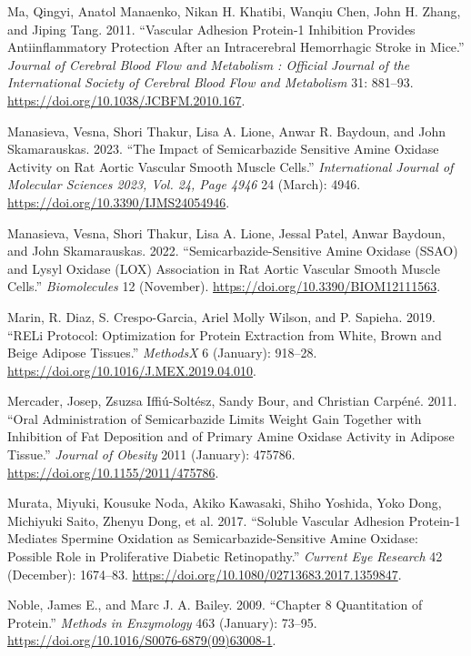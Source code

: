 \documentclass[
  letterpaper,
  DIV=11,
  numbers=noendperiod]{scrreprt}
\newlength{\cslhangindent}
\newenvironment{CSLReferences}[2] %
 {\begin{list}{}{%
  \setlength{\itemindent}{0pt}
  \setlength{\leftmargin}{0pt}
  \setlength{\parsep}{0pt}
  \ifodd #1
   \setlength{\leftmargin}{\cslhangindent}
   \setlength{\itemindent}{-1\cslhangindent}
  \fi
  \setlength{\itemsep}{#2\baselineskip}}}
 {\end{list}}
\begin{document}
\begin{CSLReferences}{1}{0}
Ma, Qingyi, Anatol Manaenko, Nikan H. Khatibi, Wanqiu Chen, John H.
Zhang, and Jiping Tang. 2011. {``Vascular Adhesion Protein-1 Inhibition
Provides Antiinflammatory Protection After an Intracerebral Hemorrhagic
Stroke in Mice.''} \emph{Journal of Cerebral Blood Flow and Metabolism :
Official Journal of the International Society of Cerebral Blood Flow and
Metabolism} 31: 881--93. \url{https://doi.org/10.1038/JCBFM.2010.167}.

Manasieva, Vesna, Shori Thakur, Lisa A. Lione, Anwar R. Baydoun, and
John Skamarauskas. 2023. {``The Impact of Semicarbazide Sensitive Amine
Oxidase Activity on Rat Aortic Vascular Smooth Muscle Cells.''}
\emph{International Journal of Molecular Sciences 2023, Vol. 24, Page
4946} 24 (March): 4946. \url{https://doi.org/10.3390/IJMS24054946}.

Manasieva, Vesna, Shori Thakur, Lisa A. Lione, Jessal Patel, Anwar
Baydoun, and John Skamarauskas. 2022. {``Semicarbazide-Sensitive Amine
Oxidase (SSAO) and Lysyl Oxidase (LOX) Association in Rat Aortic
Vascular Smooth Muscle Cells.''} \emph{Biomolecules} 12 (November).
\url{https://doi.org/10.3390/BIOM12111563}.

Marin, R. Diaz, S. Crespo-Garcia, Ariel Molly Wilson, and P. Sapieha.
2019. {``RELi Protocol: Optimization for Protein Extraction from White,
Brown and Beige Adipose Tissues.''} \emph{MethodsX} 6 (January):
918--28. \url{https://doi.org/10.1016/J.MEX.2019.04.010}.

Mercader, Josep, Zsuzsa Iffiú-Soltész, Sandy Bour, and Christian
Carpéné. 2011. {``Oral Administration of Semicarbazide Limits Weight
Gain Together with Inhibition of Fat Deposition and of Primary Amine
Oxidase Activity in Adipose Tissue.''} \emph{Journal of Obesity} 2011
(January): 475786. \url{https://doi.org/10.1155/2011/475786}.

Murata, Miyuki, Kousuke Noda, Akiko Kawasaki, Shiho Yoshida, Yoko Dong,
Michiyuki Saito, Zhenyu Dong, et al. 2017. {``Soluble Vascular Adhesion
Protein-1 Mediates Spermine Oxidation as Semicarbazide-Sensitive Amine
Oxidase: Possible Role in Proliferative Diabetic Retinopathy.''}
\emph{Current Eye Research} 42 (December): 1674--83.
\url{https://doi.org/10.1080/02713683.2017.1359847}.

Noble, James E., and Marc J. A. Bailey. 2009. {``Chapter 8 Quantitation
of Protein.''} \emph{Methods in Enzymology} 463 (January): 73--95.
\url{https://doi.org/10.1016/S0076-6879(09)63008-1}.


\end{CSLReferences}
\end{document}
